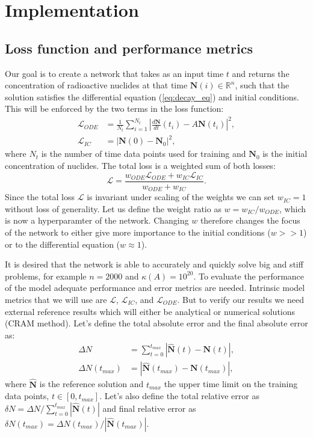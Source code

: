 \documentclass[10pt]{article}
\begin{document}
\section{Implementation}

\subsection{Loss function and performance metrics}
Our goal is to create a network that takes as an input time $t$ and returns the concentration of radioactive nuclides at that time $\mathbf{N}(i) \in \mathbb{R}^n$, such that the solution satisfies the differential equation (\ref{eq:decay_eq}) and initial conditions. This will be enforced by the two terms in the loss function:
\begin{align*}
    \mathcal{L}_{ODE} &= \frac{1}{N_t} \sum_{i = 1}^{N_t}\left|\frac{d\mathbf{N}}{dt}(t_i) - A \mathbf{N}(t_i)\right|^2,\\
    \mathcal{L}_{IC} &= |\mathbf{N}(0) - \mathbf{N}_0|^2,
\end{align*}
where $N_t$ is the number of time data points used for training and $\mathbf{N}_0$ is the initial concentration of nuclides. The total loss is a weighted sum of both losses:
\begin{equation*}
    \mathcal{L} = \frac{w_{ODE} \mathcal{L}_{ODE} + w_{IC} \mathcal{L}_{IC}}{w_{ODE} + w_{IC}}.
\end{equation*}
Since the total loss $\mathcal{L}$ is invariant under scaling of the weights we can set $w_{IC} = 1$ without loss of generality. Let us define the weight ratio as $w = w_{IC}/w_{ODE}$, which is now a hyperparamter of the network. Changing $w$ therefore changes the focus of the network to either give more importance to the initial conditions ($w >> 1$) or to the differential equation ($w \approx 1$).

It is desired that the network is able to accurately and quickly solve big and stiff problems, for example $n = 2000$ and $\kappa(A) = 10^{20}$. To evaluate the performance of the model adequate performance and error metrics are needed. Intrinsic model metrics that we will use are $\mathcal{L}$, $\mathcal{L}_{IC}$, and $\mathcal{L}_{ODE}$. But to verify our results we need external reference results which will either be analytical or numerical solutions (CRAM method). Let's define the total absolute error and the final absolute error as:
\begin{align*}
    \Delta N &= \sum_{t = 0}^{t_{max}}\left|\mathbf{\hat{N}}(t) - \mathbf{N}(t)\right|,\\
    \Delta N(t_{max}) &= \left|\mathbf{\hat{N}}(t_{max}) - \mathbf{N}(t_{max})\right|,
\end{align*}
where $\mathbf{\hat{N}}$ is the reference solution and $t_{max}$ the upper time limit on the training data points, $t \in [0, t_{max}]$. Let's also define the total relative error as $\delta N = \Delta N/\sum_{t = 0}^{t_{max}}|\mathbf{\hat{N}}(t)|$ and final relative error as $\delta N(t_{max}) = \Delta N(t_{max})/|\mathbf{\hat{N}}(t_{max})|$.
\end{document}
